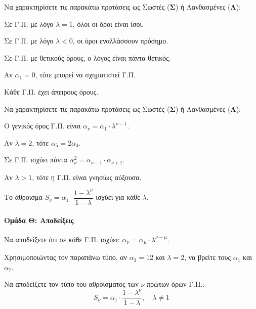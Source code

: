 \documentclass[11pt,a4paper,modern]{FFExercises}
\begin{document}
\askhsh
Να χαρακτηρίσετε τις παρακάτω προτάσεις ως Σωστές (\textbf{Σ}) ή Λανθασμένες (\textbf{Λ}):
\begin{alist}
  \item Σε Γ.Π. με λόγο $\lambda = 1$, όλοι οι όροι είναι ίσοι.
  \item Σε Γ.Π. με λόγο $\lambda < 0$, οι όροι εναλλάσσουν πρόσημο.
  \item Σε Γ.Π. με θετικούς όρους, ο λόγος είναι πάντα θετικός.
  \item Αν $\alpha_1 = 0$, τότε μπορεί να σχηματιστεί Γ.Π.
  \item Κάθε Γ.Π. έχει άπειρους όρους.
\end{alist}

\askhsh
Να χαρακτηρίσετε τις παρακάτω προτάσεις ως Σωστές (\textbf{Σ}) ή Λανθασμένες (\textbf{Λ}):
\begin{alist}
  \item Ο γενικός όρος Γ.Π. είναι $\alpha_\nu = \alpha_1 \cdot \lambda^{\nu-1}$.
  \item Αν $\lambda = 2$, τότε $\alpha_5 = 2 \alpha_4$.
  \item Σε Γ.Π. ισχύει πάντα $\alpha_{\nu}^2 = \alpha_{\nu-1} \cdot \alpha_{\nu+1}$.
  \item Αν $\lambda > 1$, τότε η Γ.Π. είναι γνησίως αύξουσα.
  \item Το άθροισμα $S_\nu = \alpha_1 \cdot \dfrac{1 - \lambda^\nu}{1 - \lambda}$ ισχύει για κάθε $\lambda$.
\end{alist}


\paragraph{Ομάδα Θ: Αποδείξεις}

\askhsh
\begin{alist}
  \item Να αποδείξετε ότι σε κάθε Γ.Π. ισχύει: $\alpha_\nu = \alpha_\mu \cdot \lambda^{\nu - \mu}$.
  \item Χρησιμοποιώντας τον παραπάνω τύπο, αν $\alpha_3 = 12$ και $\lambda = 2$, να βρείτε τους $\alpha_1$ και $\alpha_7$.
\end{alist}

\askhsh
Να αποδείξετε τον τύπο του αθροίσματος των $\nu$ πρώτων όρων Γ.Π.:
\[
S_\nu = \alpha_1 \cdot \frac{1 - \lambda^\nu}{1 - \lambda}, \quad \lambda \neq 1
\]
\end{document}

